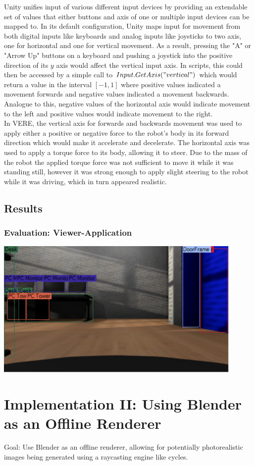 Unity unifies input of various different input devices by providing an extendable set of values that either buttons and axis of one or multiple input devices can be mapped to. In its default configuration, Unity maps input for movement from both digital inputs like keyboards and analog inputs like joysticks to two axis, one for horizontal and one for vertical movement. As a result, pressing the "A" or "Arrow Up" buttons on a keyboard and pushing a joystick into the positive direction of its $y$ axis would affect the vertical input axis. In scripts, this could then be accessed by a simple call to $Input.GetAxis("vertical")$ which would return a value in the interval $[-1, 1]$ where positive values indicated a movement forwards and negative values indicated a movement backwards. Analogue to this, negative values of the horizontal axis would indicate movement to the left and positive values would indicate movement to the right.\\
In VERE, the vertical axis for forwards and backwards movement was used to apply either a positive or negative force to the robot's body in its forward direction which would make it accelerate and decelerate. The horizontal axis was used to apply a torque force to its body, allowing it to steer. Due to the mass of the robot the applied torque force was not sufficient to move it while it was standing still, however it was strong enough to apply slight steering to the robot while it was driving, which in turn appeared realistic.


\clearpage
\subsection{Results}

\subsubsection{Evaluation: Viewer-Application}

\begin{center}
\noindent\includegraphics[width=12cm]{tex/img/ch05/VERE_Viewer_01.png}
\label{fig:vere-viewer}
\end{center}
\section{Implementation II: Using Blender as an Offline Renderer}
Goal: Use Blender as an offline renderer, allowing for potentially photorealistic images being generated using a raycasting engine like cycles.


